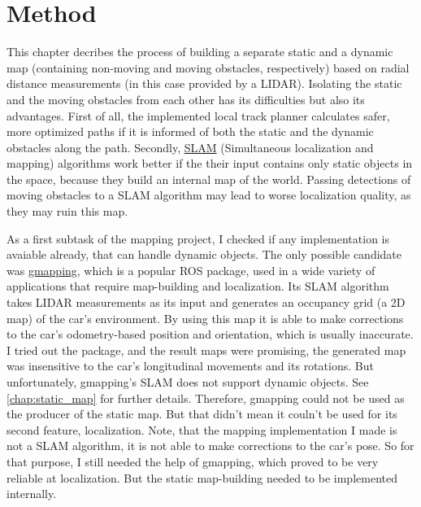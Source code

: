 \section{Method}
This chapter decribes the process of building a separate static and a dynamic map (containing non-moving and moving obstacles, respectively) based on radial distance measurements (in this case provided by a LIDAR). Isolating the static and the moving obstacles from each other has its difficulties but also its advantages. First of all, the implemented local track planner calculates safer, more optimized paths if it is informed of both the static and the dynamic obstacles along the path. Secondly, \href{https://en.wikipedia.org/wiki/Simultaneous_localization_and_mapping}{SLAM} (Simultaneous localization and mapping) algorithms work better if the their input contains only static objects in the space, because they build an internal map of the world. Passing detections of moving obstacles to a SLAM algorithm may lead to worse localization quality, as they may ruin this map.

As a first subtask of the mapping project, I checked if any implementation is avaiable already, that can handle dynamic objects. The only possible candidate was \href{http://wiki.ros.org/gmapping}{gmapping}, which is a popular ROS package, used in a wide variety of applications that require map-building and localization. Its SLAM algorithm takes LIDAR measurements as its input and generates an occupancy grid (a 2D map) of the car's environment. By using this map it is able to make corrections to the car's odometry-based position and orientation, which is usually inaccurate. I tried out the package, and the result maps were promising, the generated map was insensitive to the car's longitudinal movements and its rotations. But unfortunately, gmapping's SLAM does not support dynamic objects. See \ref{chap:static_map} for further details. Therefore, gmapping could not be used as the producer of the static map. But that didn't mean it couln't be used for its second feature, localization. Note, that the mapping implementation I made is not a SLAM algorithm, it is not able to make corrections to the car's pose. So for that purpose, I still needed the help of gmapping, which proved to be very reliable at localization. But the static map-building needed to be implemented internally.

